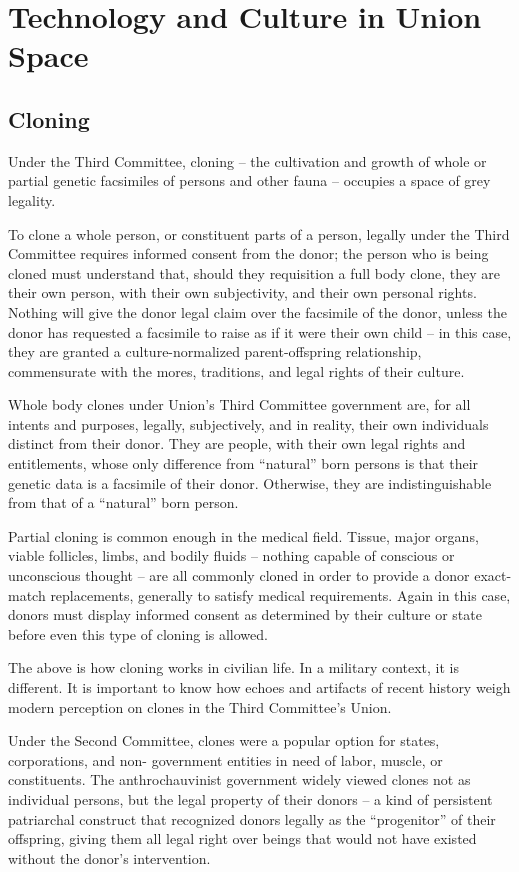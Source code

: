 \newpage
\section{Technology and Culture in Union Space}

\subsection{Cloning}

Under the Third Committee, cloning -- the cultivation and growth of whole or partial genetic
facsimiles of persons and other fauna -- occupies a space of grey legality.

To clone a whole person, or constituent parts of a person, legally under the Third Committee
requires informed consent from the donor; the person who is being cloned must understand that,
should they requisition a full body clone, they are their own person, with their own subjectivity,
and their own personal rights. Nothing will give the donor legal claim over the facsimile of the
donor, unless the donor has requested a facsimile to raise as if it were their own child -- in this
case, they are granted a culture-normalized parent-offspring relationship, commensurate with the
mores, traditions, and legal rights of their culture.

Whole body clones under Union’s Third Committee government are, for all intents and purposes,
legally, subjectively, and in reality, their own individuals distinct from their donor. They are people,
with their own legal rights and entitlements, whose only difference from ``natural'' born persons is
that their genetic data is a facsimile of their donor. Otherwise, they are indistinguishable from that
of a ``natural'' born person.

Partial cloning is common enough in the medical field. Tissue, major organs, viable follicles,
limbs, and bodily fluids -- nothing capable of conscious or unconscious thought -- are all
commonly cloned in order to provide a donor exact-match replacements, generally to satisfy
medical requirements. Again in this case, donors must display informed consent as determined
by their culture or state before even this type of cloning is allowed.

The above is how cloning works in civilian life. In a military context, it is different. It is important
to know how echoes and artifacts of recent history weigh modern perception on clones in the
Third Committee’s Union.

Under the Second Committee, clones were a popular option for states, corporations, and non-
government entities in need of labor, muscle, or constituents. The anthrochauvinist government
widely viewed clones not as individual persons, but the legal property of their donors -- a kind of
persistent patriarchal construct that recognized donors legally as the ``progenitor'' of their
offspring, giving them all legal right over beings that would not have existed without the donor’s
intervention.

